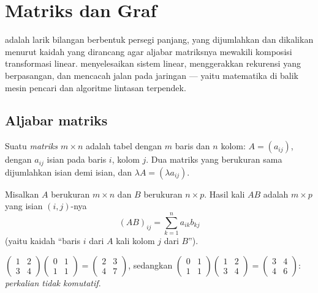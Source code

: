 \chapter{Matriks dan Graf}\label{ch:g12:matrix}

 adalah larik bilangan berbentuk persegi panjang, yang dijumlahkan dan
dikalikan menurut kaidah yang dirancang agar aljabar matriksnya mewakili komposisi
transformasi linear.  menyelesaikan sistem linear, menggerakkan 
rekurensi yang berpasangan, dan mencacah jalan pada jaringan --- yaitu matematika
di balik mesin pencari dan algoritme lintasan terpendek.

\section{Aljabar matriks}

\begin{definition}[Matriks]\label{def:g12:matrix:matrix}
Suatu \emph{matriks $m \times n$} adalah tabel  dengan
$m$ baris dan $n$ kolom:
$A = (a_{ij})$, dengan $a_{ij}$ isian pada baris $i$, kolom $j$.
Dua matriks yang berukuran sama dijumlahkan isian demi isian, dan
$\lambda A = (\lambda a_{ij})$.
\end{definition}

\begin{definition}\label{def:g12:matrix:product}
Misalkan $A$ berukuran $m \times n$ dan $B$ berukuran $n \times p$. Hasil kali $AB$
adalah  $m \times p$ yang isian $(i,j)$-nya
\[
(AB)_{ij} = \sum_{k=1}^{n} a_{ik} b_{kj}
\]
(yaitu kaidah ``baris $i$ dari $A$ kali kolom $j$ dari $B$'').
\end{definition}

\begin{example}
$\begin{pmatrix} 1 & 2\\ 3 & 4\end{pmatrix}
\begin{pmatrix} 0 & 1\\ 1 & 1\end{pmatrix}
= \begin{pmatrix} 2 & 3\\ 4 & 7\end{pmatrix}$,
\quad sedangkan \quad
$\begin{pmatrix} 0 & 1\\ 1 & 1\end{pmatrix}
\begin{pmatrix} 1 & 2\\ 3 & 4\end{pmatrix}
= \begin{pmatrix} 3 & 4\\ 4 & 6\end{pmatrix}$:
\emph{perkalian  tidak komutatif}.
\end{example}

